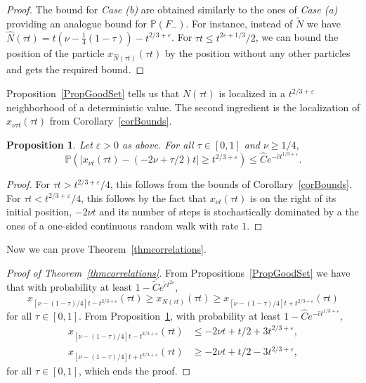 \documentclass[12pt,a4paper]{article}
\numberwithin{equation}{section}
\newcommand{\Pb}{\mathbb{P}}
\newcommand{\e}{\varepsilon}
\newtheorem{prop}{Proposition}[section]
\begin{document}
\begin{proof}
The bound for \emph{Case (b)} are obtained similarly to the ones of \emph{Case (a)} providing an analogue bound for $\Pb(F_-)$. For instance, instead of $\widetilde N$ we have $\widehat N(\tau t)=t(\nu-\tfrac14(1-\tau))-t^{2/3+\e}$. For $\tau t\leq t^{2\e+1/3}/2$, we can bound the position of the particle $x_{\widehat N(\tau t)}(\tau t)$ by the position without any other particles and gets the required bound.
\end{proof}

Proposition~\ref{PropGoodSet} tells us that $N(\tau t)$ is localized in a $t^{2/3+\e}$ neighborhood of a deterministic value. The second ingredient is the localization of $x_{\nu \tau t}(\tau t)$ from Corollary~\ref{corBounds}.
\begin{prop}\label{propLocalize}
Let $\e>0$ as above. For all $\tau\in [0,1]$ and $\nu\geq 1/4$,
\begin{equation}
\Pb(|x_{\nu t}(\tau t)-(-2\nu+\tau/2) t|\geq t^{2/3+\e})\leq \hat C e^{-\hat c t^{1/3+\e}}.
\end{equation}
\end{prop}
\begin{proof}
For $\tau t>t^{{2/3+\e}}/4$, this follows from the bounds of Corollary~\ref{corBounds}. For $\tau t<t^{2/3+\e}/4$, this follows by the fact that $x_{\nu t}(\tau t)$ is on the right of its initial position, $-2\nu t$ and its number of steps is stochastically dominated by a the ones of a one-sided continuous random walk with rate $1$.
\end{proof}

Now we can prove Theorem~\ref{thmcorrelations}.
\begin{proof}[Proof of Theorem~\ref{thmcorrelations}]
From Propositions~\ref{PropGoodSet} we have that with probability at least $1-\tilde C e^{\tilde c t^{2\e}}$,
\begin{equation}
x_{[\nu-(1-\tau)/4]t-t^{2/3+\e}}(\tau t)\geq x_{N(\tau t)}(\tau t)\geq x_{[\nu-(1-\tau)/4]t+t^{2/3+\e}}(\tau t)
\end{equation}
for all $\tau\in [0,1]$. From Proposition~\ref{propLocalize}, with probability at least $1-\hat C e^{-\hat c t^{1/3+\e}}$,
\begin{equation}
\begin{aligned}
x_{[\nu-(1-\tau)/4]t-t^{2/3+\e}}(\tau t) &\leq -2\nu t+t/2+3 t^{2/3+\e},\\
x_{[\nu-(1-\tau)/4]t+t^{2/3+\e}}(\tau t) &\geq -2\nu t+t/2-3 t^{2/3+\e},
\end{aligned}
\end{equation}
for all $\tau\in [0,1]$, which ends the proof.
\end{proof}
\end{document}
